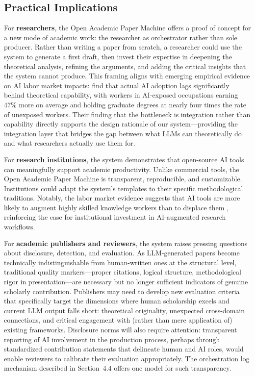 \documentclass{article}
\begin{document}
\subsection{Practical Implications}

For \textbf{researchers}, the Open Academic Paper Machine offers a proof of concept for a new mode of academic work: the researcher as orchestrator rather than sole producer. Rather than writing a paper from scratch, a researcher could use the system to generate a first draft, then invest their expertise in deepening the theoretical analysis, refining the arguments, and adding the critical insights that the system cannot produce. This framing aligns with emerging empirical evidence on AI labor market impacts: \citet{massenkoff2026labor} find that actual AI adoption lags significantly behind theoretical capability, with workers in AI-exposed occupations earning 47\% more on average and holding graduate degrees at nearly four times the rate of unexposed workers. Their finding that the bottleneck is integration rather than capability directly supports the design rationale of our system---providing the integration layer that bridges the gap between what LLMs can theoretically do and what researchers actually use them for.

For \textbf{research institutions}, the system demonstrates that open-source AI tools can meaningfully support academic productivity. Unlike commercial tools, the Open Academic Paper Machine is transparent, reproducible, and customizable. Institutions could adapt the system's templates to their specific methodological traditions. Notably, the labor market evidence suggests that AI tools are more likely to augment highly skilled knowledge workers than to displace them \citep{massenkoff2026labor}, reinforcing the case for institutional investment in AI-augmented research workflows.

For \textbf{academic publishers and reviewers}, the system raises pressing questions about disclosure, detection, and evaluation. As LLM-generated papers become technically indistinguishable from human-written ones at the structural level, traditional quality markers---proper citations, logical structure, methodological rigor in presentation---are necessary but no longer sufficient indicators of genuine scholarly contribution. Publishers may need to develop new evaluation criteria that specifically target the dimensions where human scholarship excels and current LLM output falls short: theoretical originality, unexpected cross-domain connections, and critical engagement with (rather than mere application of) existing frameworks. Disclosure norms will also require attention: transparent reporting of AI involvement in the production process, perhaps through standardized contribution statements that delineate human and AI roles, would enable reviewers to calibrate their evaluation appropriately. The orchestration log mechanism described in Section~4.4 offers one model for such transparency.
\end{document}
